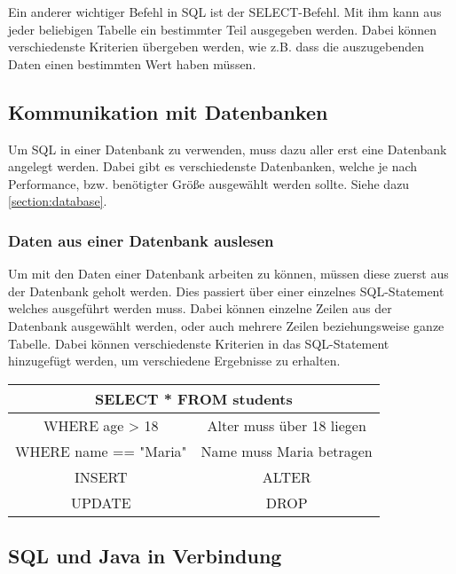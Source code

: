 Ein anderer wichtiger Befehl in SQL ist der SELECT-Befehl. Mit ihm kann aus jeder beliebigen Tabelle ein bestimmter Teil ausgegeben werden. Dabei können verschiedenste Kriterien übergeben werden, wie z.B. dass die auszugebenden Daten einen bestimmten Wert haben müssen. \cite{grundlagenSQL}
 
 
\subsection{Kommunikation mit Datenbanken}
Um SQL in einer Datenbank zu verwenden, muss dazu aller erst eine Datenbank angelegt werden. Dabei gibt es verschiedenste Datenbanken, welche je nach Performance, bzw. benötigter Größe ausgewählt werden sollte. Siehe dazu \ref{section:database}.
 
\subsubsection{Daten aus einer Datenbank auslesen}
Um mit den Daten einer Datenbank arbeiten zu können, müssen diese zuerst aus der Datenbank geholt werden. Dies passiert über einer einzelnes SQL-Statement welches ausgeführt werden muss. Dabei können einzelne Zeilen aus der Datenbank ausgewählt werden, oder auch mehrere Zeilen beziehungsweise ganze Tabelle. Dabei können verschiedenste Kriterien in das SQL-Statement hinzugefügt werden, um verschiedene Ergebnisse zu erhalten. \cite{einfuerhungSQLBuch}

\begin{center}
    \begin{tabular}{ |c|c| }
     \hline
     \multicolumn{2}{|c|}{SELECT * FROM students } \\
     \hline
     \hline
     WHERE age > 18 & Alter muss über 18 liegen \\
     \hline
     \hline
     WHERE name == "Maria" & Name muss Maria betragen  \\
     \hline
     INSERT & ALTER \\
     \hline
     UPDATE & DROP  \\
     \hline
    \end{tabular}
    \end{center}
    \cite{einfuerhungSQLBuch}


\subsection{SQL und Java in Verbindung}

